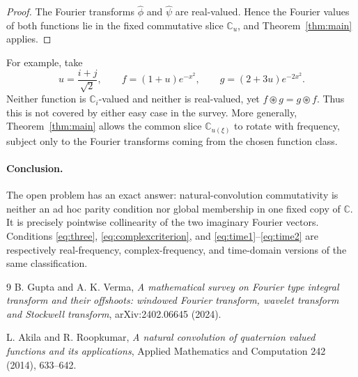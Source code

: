 \documentclass[11pt]{article}
\newcommand{\C}{\mathbb C}
\newcommand{\ostar}{\mathbin{\circledast}}
\begin{document}
\begin{proof}
The Fourier transforms $\widehat\phi$ and $\widehat\psi$ are real-valued.
Hence the Fourier values of both functions lie in the fixed commutative slice
$\C_u$, and Theorem~\ref{thm:main} applies.
\end{proof}

For example, take
\begin{equation}\label{eq:example}
 u=\frac{i+j}{\sqrt2},\qquad
 f=(1+u)e^{-x^2},\qquad g=(2+3u)e^{-2x^2}.
\end{equation}
Neither function is $\C_i$-valued and neither is real-valued, yet
$f\ostar g=g\ostar f$.  Thus this is not covered by either easy case in the
survey.  More generally, Theorem~\ref{thm:main} allows the common slice
$\C_{u(\xi)}$ to rotate with frequency, subject only to the Fourier transforms
coming from the chosen function class.

\paragraph{Conclusion.}
The open problem has an exact answer: natural-convolution commutativity is
neither an ad hoc parity condition nor global membership in one fixed copy of
$\C$.  It is precisely pointwise collinearity of the two imaginary Fourier
vectors.  Conditions \eqref{eq:three}, \eqref{eq:complexcriterion}, and
\eqref{eq:time1}--\eqref{eq:time2} are respectively real-frequency,
complex-frequency, and time-domain versions of the same classification.

\begin{thebibliography}{9}
B. Gupta and A. K. Verma,
\emph{A mathematical survey on Fourier type integral transform and their
offshoots: windowed Fourier transform, wavelet transform and Stockwell
transform}, arXiv:2402.06645 (2024).

L. Akila and R. Roopkumar,
\emph{A natural convolution of quaternion valued functions and its
applications}, Applied Mathematics and Computation 242 (2014), 633--642.
\end{thebibliography}
\end{document}
